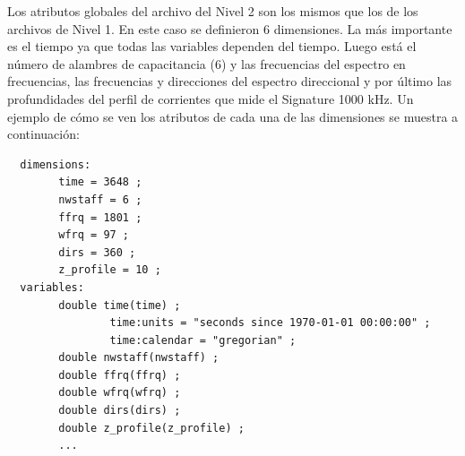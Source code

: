 \documentclass[11pt]{article}
\begin{document}
Los atributos globales del archivo del Nivel 2 son los mismos que los de los
archivos de Nivel 1. En este caso se definieron 6 dimensiones. La más importante
es el tiempo ya que todas las variables dependen del tiempo. Luego está el
número de alambres de capacitancia (6) y las frecuencias del espectro en
frecuencias, las frecuencias y direcciones del espectro direccional y por
último las profundidades del perfil de corrientes que mide el Signature 1000
kHz. Un ejemplo de cómo se ven los atributos de cada una de las dimensiones se
muestra a continuación:

\begin{verbatim}
  dimensions:
        time = 3648 ;
        nwstaff = 6 ;
        ffrq = 1801 ;
        wfrq = 97 ;
        dirs = 360 ;
        z_profile = 10 ;
  variables:
        double time(time) ;
                time:units = "seconds since 1970-01-01 00:00:00" ;
                time:calendar = "gregorian" ;
        double nwstaff(nwstaff) ;
        double ffrq(ffrq) ;
        double wfrq(wfrq) ;
        double dirs(dirs) ;
        double z_profile(z_profile) ;
        ...
\end{verbatim}
\end{document}
